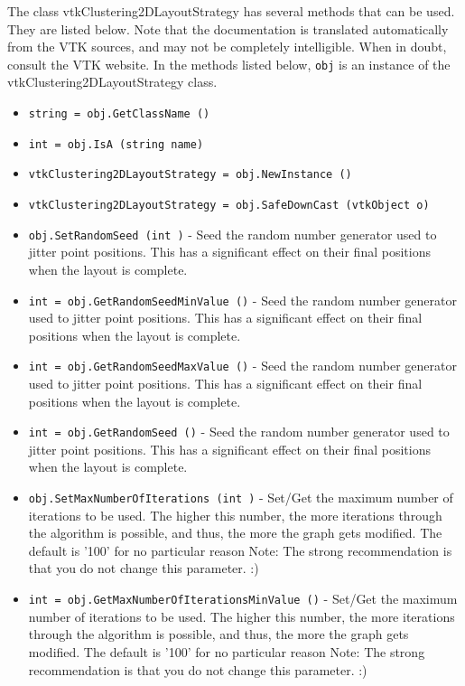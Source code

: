 The class vtkClustering2DLayoutStrategy has several methods that can be used.
  They are listed below.
Note that the documentation is translated automatically from the VTK sources,
and may not be completely intelligible.  When in doubt, consult the VTK website.
In the methods listed below, \verb|obj| is an instance of the vtkClustering2DLayoutStrategy class.
\begin{itemize}
\item  \verb|string = obj.GetClassName ()|

\item  \verb|int = obj.IsA (string name)|

\item  \verb|vtkClustering2DLayoutStrategy = obj.NewInstance ()|

\item  \verb|vtkClustering2DLayoutStrategy = obj.SafeDownCast (vtkObject o)|

\item  \verb|obj.SetRandomSeed (int )| -  Seed the random number generator used to jitter point positions.
 This has a significant effect on their final positions when
 the layout is complete.

\item  \verb|int = obj.GetRandomSeedMinValue ()| -  Seed the random number generator used to jitter point positions.
 This has a significant effect on their final positions when
 the layout is complete.

\item  \verb|int = obj.GetRandomSeedMaxValue ()| -  Seed the random number generator used to jitter point positions.
 This has a significant effect on their final positions when
 the layout is complete.

\item  \verb|int = obj.GetRandomSeed ()| -  Seed the random number generator used to jitter point positions.
 This has a significant effect on their final positions when
 the layout is complete.

\item  \verb|obj.SetMaxNumberOfIterations (int )| -  Set/Get the maximum number of iterations to be used.
 The higher this number, the more iterations through the algorithm
 is possible, and thus, the more the graph gets modified.
 The default is '100' for no particular reason
 Note: The strong recommendation is that you do not change
 this parameter. :)

\item  \verb|int = obj.GetMaxNumberOfIterationsMinValue ()| -  Set/Get the maximum number of iterations to be used.
 The higher this number, the more iterations through the algorithm
 is possible, and thus, the more the graph gets modified.
 The default is '100' for no particular reason
 Note: The strong recommendation is that you do not change
 this parameter. :)


\end{itemize}
